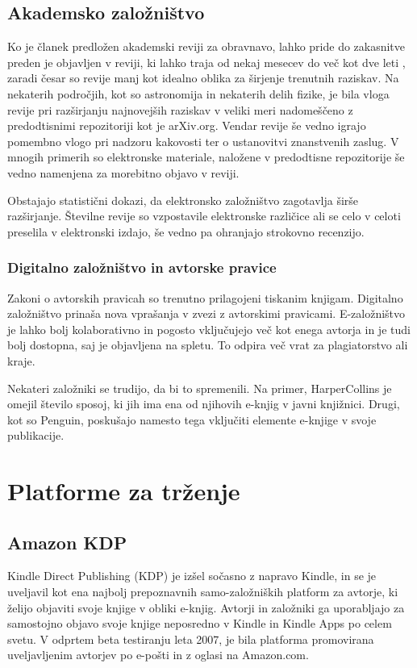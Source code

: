 \documentclass[a4paper, 12pt]{book}
\begin{document}
\section{Akademsko založništvo}
\label{akademsko_z}
Ko je članek predložen akademski reviji za obravnavo, lahko pride do zakasnitve preden je objavljen v reviji, ki lahko traja od nekaj mesecev do več kot dve leti \cite{40}, zaradi česar so revije manj kot idealno oblika za širjenje trenutnih raziskav. Na nekaterih področjih, kot so astronomija in nekaterih delih fizike, je bila vloga revije pri razširjanju najnovejših raziskav v veliki meri nadomeščeno z predodtisnimi repozitoriji kot je arXiv.org. Vendar revije še vedno igrajo pomembno vlogo pri nadzoru kakovosti ter o ustanovitvi znanstvenih zaslug. V mnogih primerih so elektronske materiale, naložene v predodtisne repozitorije še vedno namenjena za morebitno objavo v reviji.

Obstajajo statistični dokazi, da elektronsko založništvo zagotavlja širše razširjanje. \cite{41} Številne revije so vzpostavile elektronske različice ali se celo v celoti preselila v elektronski izdajo, še vedno pa ohranjajo strokovno recenzijo.

\subsection{Digitalno založništvo in avtorske pravice}
Zakoni o avtorskih pravicah so trenutno prilagojeni tiskanim knjigam. Digitalno založništvo prinaša nova vprašanja v zvezi z avtorskimi pravicami. E-založništvo je lahko bolj kolaborativno in pogosto vključujejo več kot enega avtorja in  je tudi bolj dostopna, saj je objavljena na spletu. To odpira več vrat za plagiatorstvo ali kraje.\cite{42}

Nekateri založniki se trudijo, da bi to spremenili. Na primer, HarperCollins je omejil število sposoj, ki jih ima ena od njihovih e-knjig v javni knjižnici.\cite{43} Drugi, kot so Penguin, poskušajo namesto tega vključiti elemente e-knjige v svoje publikacije. 

\chapter{Platforme za trženje}
\label{platforme}

\section{Amazon KDP}
Kindle Direct Publishing (KDP) je izšel sočasno z napravo Kindle, in se je uveljavil kot ena najbolj prepoznavnih samo-založniških platform za avtorje, ki želijo objaviti svoje knjige v obliki e-knjig.  Avtorji in založniki ga uporabljajo za samostojno objavo svoje knjige neposredno v Kindle in Kindle Apps po celem svetu. V odprtem beta testiranju leta 2007, je bila platforma promovirana uveljavljenim avtorjev po e-pošti \cite{44} in z oglasi na Amazon.com.
\end{document}
